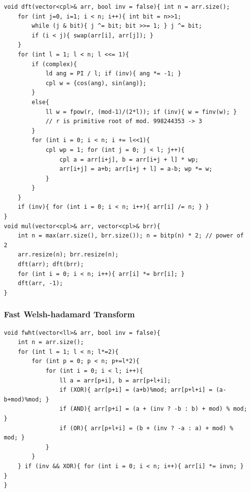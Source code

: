 \begin{verbatim}
void dft(vector<cpl>& arr, bool inv = false){ int n = arr.size();
	for (int j=0, i=1; i < n; i++){ int bit = n>>1;
		while (j & bit){ j ^= bit; bit >>= 1; } j ^= bit;
		if (i < j){ swap(arr[i], arr[j]); }
	}
	for (int l = 1; l < n; l <<= 1){
		if (complex){
			ld ang = PI / l; if (inv){ ang *= -1; }
			cpl w = {cos(ang), sin(ang)};
		}
		else{
			ll w = fpow(r, (mod-1)/(2*l)); if (inv){ w = finv(w); }
			// r is primitive root of mod. 998244353 -> 3
		}
		for (int i = 0; i < n; i += l<<1){
			cpl wp = 1; for (int j = 0; j < l; j++){
				cpl a = arr[i+j], b = arr[i+j + l] * wp;
				arr[i+j] = a+b; arr[i+j + l] = a-b; wp *= w;
			}
		}
	}
	if (inv){ for (int i = 0; i < n; i++){ arr[i] /= n; } }
}
void mul(vector<cpl>& arr, vector<cpl>& brr){
	int n = max(arr.size(), brr.size()); n = bitp(n) * 2; // power of 2
	arr.resize(n); brr.resize(n);
	dft(arr); dft(brr);
	for (int i = 0; i < n; i++){ arr[i] *= brr[i]; }
	dft(arr, -1);
}
\end{verbatim}

\subsubsection*{Fast Welsh-hadamard Transform}
\begin{verbatim}
void fwht(vector<ll>& arr, bool inv = false){
	int n = arr.size();
	for (int l = 1; l < n; l*=2){
		for (int p = 0; p < n; p+=l*2){
			for (int i = 0; i < l; i++){
				ll a = arr[p+i], b = arr[p+l+i];
				if (XOR){ arr[p+i] = (a+b)%mod; arr[p+l+i] = (a-b+mod)%mod; }
				if (AND){ arr[p+i] = (a + (inv ? -b : b) + mod) % mod; }
				if (OR){ arr[p+l+i] = (b + (inv ? -a : a) + mod) % mod; }
			}
		}
	} if (inv && XOR){ for (int i = 0; i < n; i++){ arr[i] *= invn; } }
}
\end{verbatim}